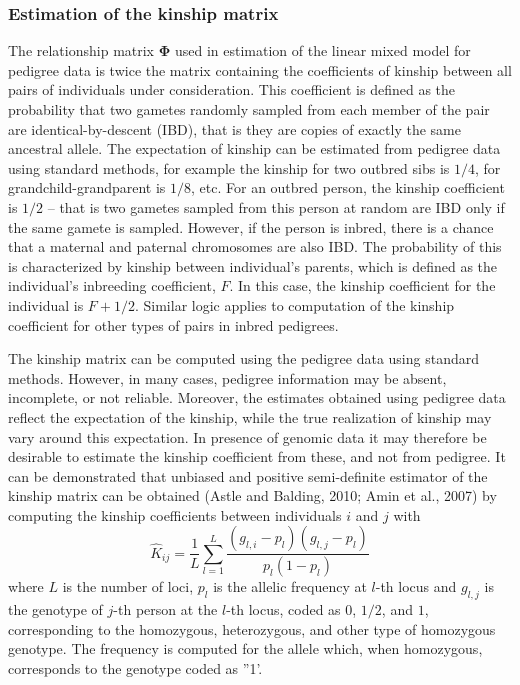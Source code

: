 \documentclass[12pt,a4paper]{article}
\begin{document}
\subsubsection{Estimation of the kinship matrix}
\label{kinship}

The relationship matrix $\mathbf{\Phi}$ used in estimation of the 
linear mixed model for pedigree data is twice the matrix containing 
the coefficients of kinship between all pairs of individuals under consideration. 
This coefficient is defined as the probability that two gametes randomly sampled 
from each member of the pair are identical-by-descent (IBD), that is they are copies 
of exactly the same ancestral allele. The expectation of kinship 
can be estimated from pedigree data using standard methods, for example the 
kinship for two outbred sibs is $1/4$, for grandchild-grandparent is $1/8$, etc.
For an outbred person, the kinship coefficient is $1/2$ -- that is two gametes 
sampled from this person at random are IBD only if the same gamete is 
sampled. However, if the person is inbred, there is a chance that a maternal 
and paternal chromosomes are also IBD. The probability of this is characterized 
by kinship between individual's parents, which is defined as the individual's
inbreeding coefficient, $F$. In this case, the kinship coefficient for the 
individual is $F + 1/2$. Similar logic applies to computation of the kinship 
coefficient for other types of pairs in inbred pedigrees. 

The kinship matrix can be computed using the pedigree data using standard methods.
However, in many cases, pedigree information may be absent, incomplete, or not 
reliable. Moreover, the estimates obtained using pedigree data reflect the 
expectation of the kinship, while the true realization of kinship may vary 
around this expectation. In presence of genomic data it may therefore be 
desirable to estimate the kinship coefficient from these, and not from pedigree. 
It can be demonstrated that unbiased and positive semi-definite estimator 
of the kinship matrix can be obtained (Astle and Balding, 2010; Amin et al., 2007)
by computing the kinship coefficients between individuals $i$ and $j$ with
$$
\hat{K}_{ij} = \frac{1}{L} \sum_{l=1}^L \frac{ (g_{l,i} - p_l) (g_{l,j} - p_l) }{ p_l (1-p_l) }
$$
where $L$ is the number of loci, $p_l$ is the allelic frequency at $l$-th locus
and $g_{l,j}$ is the genotype of $j$-th person at the $l$-th locus, coded 
as $0$, $1/2$, and $1$, corresponding to the homozygous, heterozygous, and 
other type of homozygous genotype. The frequency is computed for the allele 
which, when homozygous, corresponds to the genotype coded as ''1'.
\end{document}
